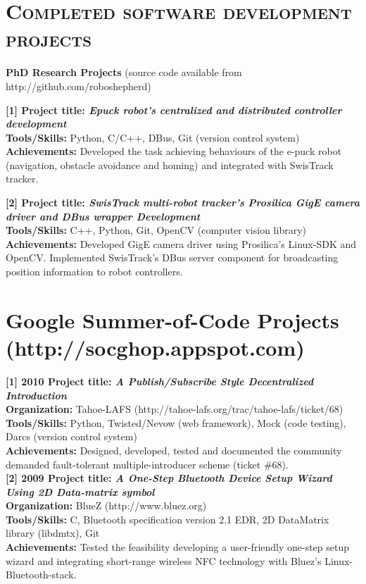 \documentclass[notopicbreak,contbibnum,plain]{simplecv}
\begin{document}
\section{\textsc{Completed software development projects}}
\vspace*{-0.2cm}
\textbf{PhD Research Projects} (source code available from http://github.com/roboshepherd)
\begin{topic}
\vspace*{-0.2cm}
\item \textbf{[1] Project title: \textit{Epuck robot's centralized and distributed controller development}}\\
\textbf{Tools/Skills:} Python, C/C++, DBus, Git (version control system)\\
\textbf{Achievements:} Developed the task achieving behaviours of the e-puck robot (navigation, obstacle avoidance and homing) and integrated with SwisTrack tracker.
\vspace*{-0.2cm}
\item \textbf{[2] Project title: \textit{SwisTrack multi-robot tracker's Prosilica GigE camera driver and DBus wrapper Development}}\\
\textbf{Tools/Skills:} C++, Python, Git, OpenCV (computer vision library)\\
\textbf{Achievements:} Developed GigE camera driver using Prosilica's Linux-SDK and OpenCV. Implemented SwisTrack's DBus server component for broadcasting position information to robot controllers.
\vspace*{-0.3cm}
\end{topic}
\section{\textbf{Google Summer-of-Code Projects} (http://socghop.appspot.com)}
\vspace*{-0.3cm}
\textbf{[1] 2010 Project title: \textit{A Publish/Subscribe Style Decentralized Introduction}}\\
\textbf{Organization:} Tahoe-LAFS (http://tahoe-lafs.org/trac/tahoe-lafs/ticket/68)\\
\textbf{Tools/Skills:} Python, Twisted/Nevow (web framework), Mock (code testing), Darcs (version control system)\\
\textbf{Achievements:} Designed, developed, tested and documented the community demanded fault-tolerant multiple-introducer scheme (ticket \#68).\\
\textbf{[2] 2009 Project title: \textit{A One-Step Bluetooth Device Setup Wizard Using 2D Data-matrix symbol}}\\
\textbf{Organization:} BlueZ (http://www.bluez.org) \\
\textbf{Tools/Skills:} C, Bluetooth specification version 2.1 EDR, 2D DataMatrix library (libdmtx), Git\\
\textbf{Achievements:} Tested the feasibility developing a user-friendly one-step setup wizard and integrating short-range wireless NFC technology with Bluez's Linux-Bluetooth-stack.
\vspace*{-0.3cm}
\end{document}
